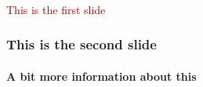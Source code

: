 \documentclass[c]{beamer}
\begin{document}
  \begin{frame}
    \frametitle{}
    \textcolor{darkred}{{\fontsize{60pt}{1em}\selectfont This is the first slide}}
  \end{frame}
  \begin{frame}
    \frametitle{This is the second slide}
    \framesubtitle{A bit more information about this}
  \end{frame}
\end{document}
